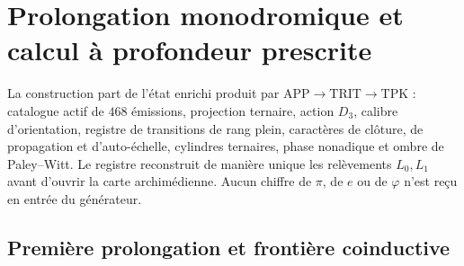 \section{Prolongation monodromique et calcul à profondeur prescrite}
\label{sec:generacion-monodromica-certificada-rev7}

La construction part de l'état enrichi produit par
\(\mathrm{APP}\to\mathrm{TRIT}\to\mathrm{TPK}\) : catalogue actif de
\(468\) émissions, projection ternaire, action \(D_3\), calibre
d'orientation, registre de transitions de rang plein, caractères de
clôture, de propagation et d'auto-échelle, cylindres ternaires, phase nonadique et
ombre de Paley--Witt. Le registre reconstruit de manière unique les
relèvements \(L_0,L_1\) avant d'ouvrir la carte archimédienne. Aucun
chiffre de \(\pi\), de \(e\) ou de \(\varphi\) n'est reçu en entrée du générateur.

\subsection{Première prolongation et frontière coinductive}

